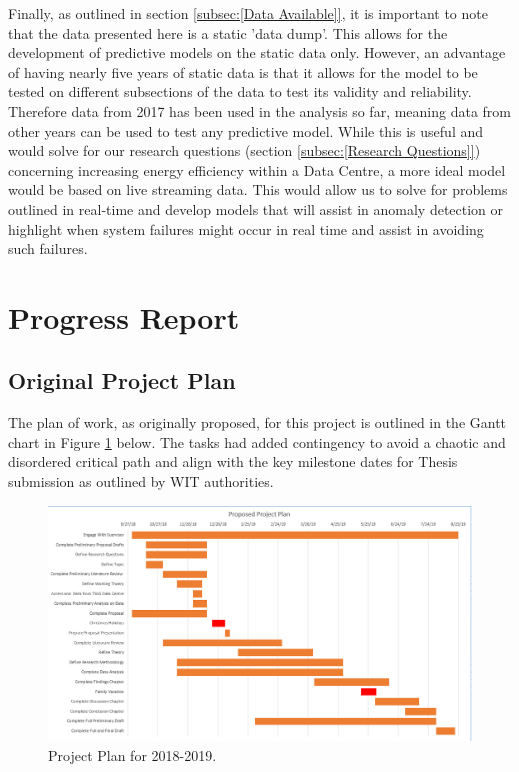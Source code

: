 \documentclass[12pt]{scrartcl}
\begin{document}
Finally, as outlined in section \ref{subsec:[Data Available]}, it is important to note that the data presented here is a static 'data dump'. This allows for the development of predictive models on the static data only. However, an advantage of having nearly five years of static data is that it allows for the model to be tested on different subsections of the data to test its validity and reliability.  Therefore data from 2017 has been used in the analysis so far, meaning data from other years can be used to test any predictive model. While this is useful and would solve for our research questions (section \ref{subsec:[Research Questions]}) concerning increasing energy efficiency within a Data Centre, a more ideal model would be based on live streaming data. This would allow us to solve for problems outlined in real-time and develop models that will assist in anomaly detection or highlight when system failures might occur in real time and assist in avoiding such failures. 

\section{Progress Report}
\label{sec:[Progress Report]}

\subsection{Original Project Plan}
\label{subsec:[Original Project Plan]}
The plan of work, as originally proposed, for this project is outlined in the Gantt chart in Figure \ref{fig:projectplan} below. The  tasks had added contingency to avoid a chaotic and disordered critical path and align with the key milestone dates for Thesis submission as outlined by WIT authorities. 

\begin{figure}[h]
  \caption{Project Plan for 2018-2019.}
  \label{fig:projectplan}
  \centering
    \includegraphics[scale=0.45]{Gannt_Chart_schedule_of_work}
\end{figure}
\end{document}
